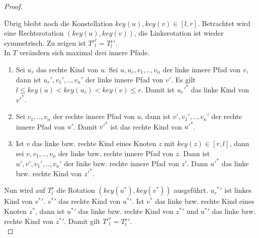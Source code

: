 \documentclass[a4paper,12pt]{article}
\begin{document}
\begin{proof}
\begin{enumerate}
	\end{enumerate}	
	\noindent Übrig bleibt noch die Konstellation $\mathit{key}\left(u\right),\mathit{key}(v) \in \left[l,r\right]$. 
	Betrachtet wird eine Rechtsrotation $\left(\mathit{key}\left(u\right),\mathit{key}\left(v\right)\right)$, die Linksrotation ist wieder symmetrisch. 
	Zu zeigen ist ${T'}^r_l = T{^r_l}' $.\\
	In $T$ verändern sich maximal drei innere Pfade.
	\begin{enumerate}
		\item Sei $u_r$ das rechte Kind von $u$. Sei $u,u_r,v_1,..,v_n$ der linke innere Pfad von $v$, dann ist ${u_r}',{v_1}',..,{v_n}'$ der linke innere Pfad von $v'$. Es gilt ${l \leq \mathit{key}\left(u\right) < \mathit{key}\left(u_r\right) < \mathit{key}\left(v\right) \leq r}$. Damit ist ${{u_r}'}^*$ das linke Kind von ${v'}^*$.
		\item Sei $v_1,..,v_n$ der rechte innere Pfad von $u$, dann ist $v',{v_1}',..,{v_n}'$ der rechte innere Pfad von $u'$. Damit  ${v'}^*$ ist das rechte Kind von ${u'}^*$.
		\item Ist $v$ das linke bzw. rechte Kind eines Knoten $z$ mit $\mathit{key}(z) \in \left[r,l\right]$, dann sei  $v,v_1,..,v_n$ der linke bzw. rechte innere Pfad von $z$. Dann ist  $u',v',{v_1}',..,{v_n}'$ der linke bzw. rechte innere Pfad von $z'$. Dann ${u'}^*$ das linke bzw. rechte Kind von ${z'}^*$.
	\end{enumerate}
	\noindent Nun wird auf ${T}^r_l$ die Rotation $ \left(\mathit{key}\left(u^*\right),\mathit{key}\left(v^*\right)\right)$ ausgeführt. ${{u_r}^*}'$ ist linkes Kind von $v{^*}'$. $v{^*}'$ das rechte Kind von $u{^*}'$. Ist $v^*$ das linke bzw. rechte Kind eines Knoten $z^*$, dann ist $u{^*}'$ das linke bzw. rechte Kind von $z{^*}'$ und $u{^*}'$ das linke bzw. rechte Kind von $z{^*}'$. Damit gilt ${T'}^r_l = T{^r_l}'$.\\
	
\end{proof}
\end{document}
